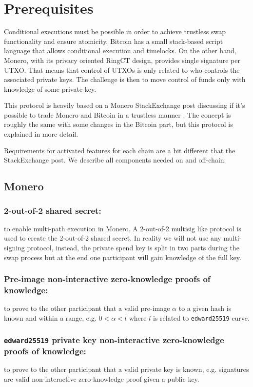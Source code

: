 \documentclass{llncs}
\begin{document}
\section{Prerequisites}
Conditional executions must be possible in order to achieve trustless swap functionality and ensure atomicity. Bitcoin has a small stack-based script language that allows conditional execution and timelocks. On the other hand, Monero, with its privacy oriented RingCT design, provides single signature per UTXO. That means that control of UTXOs is only related to who controls the associated private keys. The challenge is then to move control of funds only with knowledge of some private key.

This protocol is heavily based on a Monero StackExchange post discussing if it's possible to trade Monero and Bitcoin in a trustless manner \cite{MoneroStackexchangeSwap}. The concept is roughly the same with some changes in the Bitcoin part, but this protocol is explained in more detail.

Requirements for activated features for each chain are a bit different that the StackExchange post. We describe all components needed on and off-chain.

\subsection{Monero}

\subsubsection{2-out-of-2 shared secret:}
to enable multi-path execution in Monero. A 2-out-of-2 multisig like protocol is used to create the 2-out-of-2 shared secret. In reality we will not use any multi-signing protocol, instead, the private spend key is split in two parts during the swap process but at the end one participant will gain knowledge of the full key.

\subsubsection{Pre-image non-interactive zero-knowledge proofs of knowledge:}
to prove to the other participant that a valid pre-image $\alpha$ to a given hash is known and within a range, e.g. $0 < \alpha < l$ where $l$ is related to \texttt{edward25519} curve.

\subsubsection{\texttt{edward25519} private key non-interactive zero-knowledge proofs of knowledge:}
to prove to the other participant that a valid private key is known, e.g. signatures are valid non-interactive zero-knowledge proof given a public key.
\end{document}
